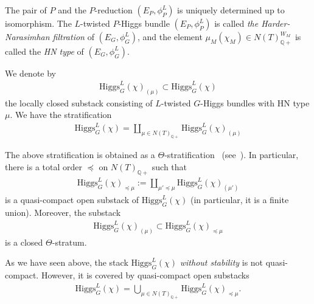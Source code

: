 \documentclass [11pt,oneside,a4paper,mathscr]{amsart}
\theoremstyle{definition}
\newcommand{\Hig}{\mathrm{Higgs}}
\begin{document}
The pair of $P$ and the $P$-reduction $(E_P, \phi_P^L)$ is uniquely determined 
up to isomorphism. The $L$-twisted $P$-Higgs bundle $(E_P, \phi_P^L)$ is called 
\textit{the Harder-Narasimhan filtration} of $(E_G, \phi_G^{L})$,
and the element $\mu_M(\chi_M)\in N(T)^{W_M}_{\mathbb{Q}+}$
is called the \textit{HN type} of $(E_G, \phi_G^{L})$. 

We denote by 
\begin{align*}
    \Hig_G^{L}(\chi)_{(\mu)} \subset \Hig_G^{L}(\chi)
\end{align*}
the locally closed substack consisting of $L$-twisted $G$-Higgs bundles with 
HN type $\mu$. We have the stratification 
\begin{align*}
    \Hig_G^{L}(\chi)=\coprod_{\mu \in N(T)_{\mathbb{Q}+}}\Hig_G^{L}(\chi)_{(\mu)}
\end{align*}

The above stratification is obtained as a $\Theta$-stratification~\cite{HalpTheta, Halphiggs, halpinstab} (see~\cite[Section~1.0.6]{Halphiggs}).
In particular, there is a total order $\preceq$ on $N(T)_{\mathbb{Q}+}$ such that 
\begin{align}\label{higgs:strata}
\Hig_G^{L}(\chi)_{\preceq \mu}:=\coprod_{\mu'\preceq \mu}\Hig_G^{L}(\chi)_{(\mu')}
\end{align}
is a quasi-compact open substack of $\Hig_G^{L}(\chi)$ (in particular, it is a finite union).
Moreover, the substack 
\begin{align*}
    \Hig_G^{L}(\chi)_{(\mu)} \subset 
\Hig_G^{L}(\chi)_{\preceq \mu}
\end{align*}
is a closed $\Theta$-stratum. 

As we have seen above, the stack $\Hig^L_G(\chi)$ \textit{without stability} is not
quasi-compact. 
However, it is covered by quasi-compact open substacks 
\begin{align}\label{cov:open}
    \Hig^L_G(\chi)=\bigcup_{\mu\in N(T)_{\mathbb{Q}+}}
    \Hig^L_G(\chi)_{\preceq \mu}.
\end{align}
\end{document}

